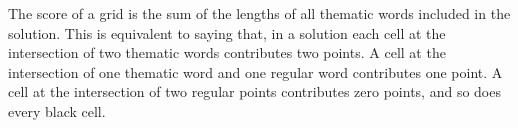 The score of a grid is the sum of the lengths of all thematic words included in the solution. 
This is equivalent to saying that, in a solution each cell at the intersection of two
thematic words contributes two points. A cell at the intersection of one thematic word
and one regular word contributes one point. A cell at the intersection of two 
regular points contributes zero points, and so does every black cell.

